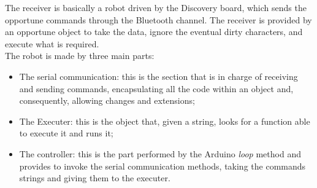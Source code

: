 The receiver is basically a robot driven by the Discovery board, which sends the opportune commands through the Bluetooth channel. The receiver is provided by an opportune object to take the data, ignore the eventual dirty characters, and execute what is required.\\
The robot is made by three main parts:
\begin{itemize}
	\item The serial communication: this is the section that is in charge of receiving and sending commands, encapsulating all the code within an object and, consequently, allowing changes and extensions;
	\item The Executer: this is the object that, given a string, looks for a function able to execute it and runs it;
	\item The controller: this is the part performed by the Arduino \textit{loop} method and provides to invoke the serial communication methods, taking the commands strings and giving them to the executer.
\end{itemize}


